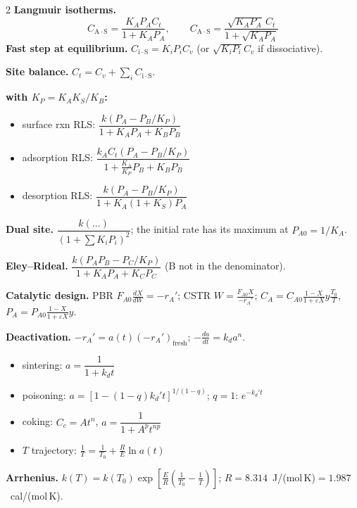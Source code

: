 \documentclass[11pt]{article}
\newcommand{\AS}[1]{\mathrm{#1\!\cdot\!S}}
\begin{document}
\begin{multicols}{2}
\textbf{Langmuir isotherms.}
\[
C_{\AS{A}}=\frac{K_AP_AC_t}{1+K_AP_A},\qquad C_{\AS{A}}=\frac{\sqrt{K_AP_A}\,C_t}{1+\sqrt{K_AP_A}}
\]
\textbf{Fast step at equilibrium.} $C_{\AS{i}}=K_iP_iC_v$ (or $\sqrt{K_iP_i}C_v$ if dissociative).

\textbf{Site balance.} $C_t=C_v+\sum_iC_{\AS{i}}$.

\textbf{ with $K_P=K_AK_S/K_B$:}
\begin{itemize}[leftmargin=*]
\item surface rxn RLS: $\dfrac{k(P_A-P_B/K_P)}{1+K_AP_A+K_BP_B}$
\item adsorption RLS: $\dfrac{k_AC_t(P_A-P_B/K_P)}{1+\frac{K_A}{K_P}P_B+K_BP_B}$
\item desorption RLS: $\dfrac{k(P_A-P_B/K_P)}{1+K_A(1+K_S)P_A}$
\end{itemize}

\textbf{Dual site.} $\dfrac{k(\ldots)}{(1+\sum K_iP_i)^2}$; the initial rate has its maximum at $P_{A0}=1/K_A$.

\textbf{Eley--Rideal.} $\dfrac{k(P_AP_B-P_C/K_P)}{1+K_AP_A+K_CP_C}$ (B not in the denominator).

\textbf{Catalytic design.} PBR $F_{A0}\frac{dX}{dW}=-r_A'$; CSTR $W=\frac{F_{A0}X}{-r_A'}$;
$C_A=C_{A0}\frac{1-X}{1+\varepsilon X}y\frac{T_0}{T}$, $P_A=P_{A0}\frac{1-X}{1+\varepsilon X}y$.

\textbf{Deactivation.} $-r_A'=a(t)(-r_A')_{\text{fresh}}$; $-\frac{da}{dt}=k_da^n$.
\begin{itemize}[leftmargin=*]
\item sintering: $a=\dfrac{1}{1+k_dt}$
\item poisoning: $a=[1-(1-q)k_d't]^{1/(1-q)}$; $q=1$: $e^{-k_d't}$
\item coking: $C_c=At^n$, $a=\dfrac{1}{1+A^pt^{np}}$
\item $T$ trajectory: $\frac1T=\frac1{T_0}+\frac{R}{E}\ln a(t)$
\end{itemize}

\textbf{Arrhenius.} $k(T)=k(T_0)\exp\!\left[\frac{E}{R}\left(\frac{1}{T_0}-\frac1T\right)\right]$;
$R=8.314$~J/(mol\,K)$=1.987$~cal/(mol\,K).
\end{multicols}
\end{document}

